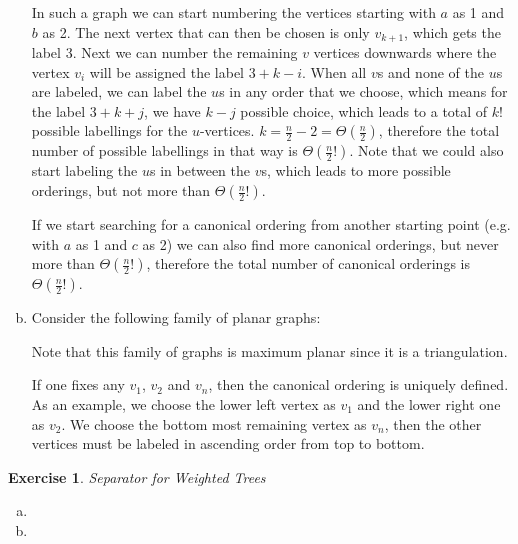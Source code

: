 \documentclass[a4paper,12pt,headsepline]{scrartcl}
\newtheorem{aufgabe}{Exercise}
\begin{document}
\begin{enumerate}[a)]
    In such a graph we can start numbering the vertices starting with $a$ as 1 and $b$ as 2.
    The next vertex that can then be chosen is only $v_{k+1}$, which gets the label 3.
    Next we can number the remaining $v$ vertices downwards where the vertex $v_i$ will be assigned the label $3+k-i$.
    When all $v$s and none of the $u$s are labeled, we can label the $u$s in any order that we choose, which means for the label $3+k+j$, we have $k-j$ possible choice, which leads to a total of $k!$ possible labellings for the $u$-vertices.
    $k=\frac{n}{2}-2=\Theta(\frac{n}{2})$, therefore the total number of possible labellings in that way is $\Theta(\frac{n}{2}!)$.
    Note that we could also start labeling the $u$s in between the $v$s, which leads to more possible orderings, but not more than $\Theta(\frac{n}{2}!)$.
    
    If we start searching for a canonical ordering from another starting point (e.g. with $a$ as 1 and $c$ as 2) we can also find more canonical orderings, but never more than $\Theta(\frac{n}{2}!)$, therefore the total number of canonical orderings is $\Theta(\frac{n}{2}!)$.
  \item Consider the following family of planar graphs:
    \begin{center}
    \end{center}
    Note that this family of graphs is maximum planar since it is a triangulation.

    If one fixes any $v_1$, $v_2$ and $v_n$, then the canonical ordering is uniquely defined.
    As an example, we choose the lower left vertex as $v_1$ and the lower right one as $v_2$.
    We choose the bottom most remaining vertex as $v_n$, then the other vertices must be labeled in ascending order from top to bottom.
\end{enumerate}

\newpage
\begin{aufgabe}Separator for Weighted Trees
\end{aufgabe}
\begin{enumerate}[a)]
  \item
  \item
\end{enumerate}
\end{document}
